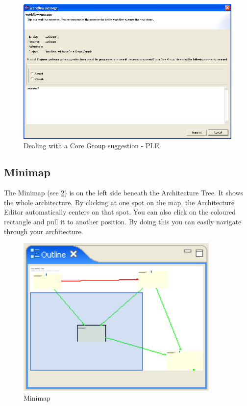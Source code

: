 \begin{figure}[h!]
\begin{center}
\includegraphics[width=14cm]{core3.png}
   \caption{Dealing with a Core Group suggestion - PLE}
\label{core3}
\end{center}
\end{figure}\par


\subsection{Minimap}

The Minimap (see \ref{map}) is on the left side beneath the Architecture Tree. It shows the whole architecture.
By clicking at one spot on the map, the Architecture Editor automatically centers on that
spot. You can also click on the coloured rectangle and pull it to another position. 
By doing this you can easily navigate through your architecture.

\begin{figure}[h!]
\begin{center}
\includegraphics[width=10cm]{outline.png}
   \caption{Minimap}
\label{map}
\end{center}
\end{figure}\par




